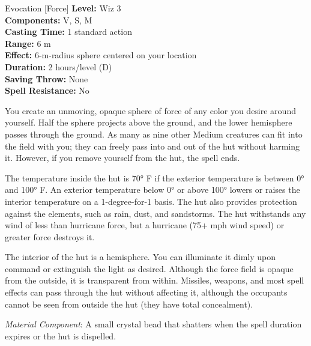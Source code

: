 {Evocation [Force]}
{
	\textbf{Level:}
	Wiz 3\\
	\textbf{Components:}
	V, S, M\\
	\textbf{Casting Time:}
	1 standard action\\
	\textbf{Range:}
	6 m\\
	\textbf{Effect:}
	6-m-radius sphere centered on your location\\
	\textbf{Duration:}
	2 hours/level (D)\\
	\textbf{Saving Throw:}
	None\\
	\textbf{Spell Resistance:}
	No\\
}
{
	You create an unmoving, opaque sphere of force of any color you desire around yourself. Half the sphere projects above the ground, and the lower hemisphere passes through the ground. As many as nine other Medium creatures can fit into the field with you; they can freely pass into and out of the hut without harming it. However, if you remove yourself from the hut, the spell ends.

	The temperature inside the hut is 70° F if the exterior temperature is between 0° and 100° F. An exterior temperature below 0° or above 100° lowers or raises the interior temperature on a 1-degree-for-1 basis. The hut also provides protection against the elements, such as rain, dust, and sandstorms. The hut withstands any wind of less than hurricane force, but a hurricane (75+ mph wind speed) or greater force destroys it.

	The interior of the hut is a hemisphere. You can illuminate it dimly upon command or extinguish the light as desired. Although the force field is opaque from the outside, it is transparent from within. Missiles, weapons, and most spell effects can pass through the hut without affecting it, although the occupants cannot be seen from outside the hut (they have total concealment).

	\textit{Material Component}:
	A small crystal bead that shatters when the spell duration expires or the hut is dispelled.

}
